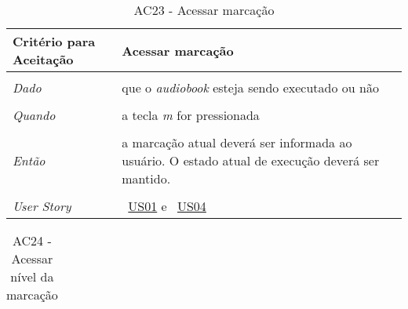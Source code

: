 \begin{apendicesenv}
\begin{table}[ht]
\begin{center}
\begin{tabularx}{\textwidth}{|lX|l|}
\end{tabularx}
\end{center}
\label{tab:us01a22}
\end{table}


\begin{table}[ht]
\centering
\caption{AC23 - Acessar marcação}
\vspace{0.1cm}
\begin{center}
\begin{tabularx}{\textwidth}{|lX|l|}

\hline
\textbf{Critério para Aceitação} & Acessar marcação \\
\hline
 & \\			
\textit{Dado} & que o \textit{audiobook} esteja sendo executado ou não \\
 & \\
\textit{Quando} & a tecla \textit{m} for pressionada \\
 & \\
\textit{Então} & a marcação atual deverá ser informada ao usuário. O estado atual de execução deverá ser mantido. \\
 & \\
\hline
\textit{User Story} & ~\hyperref[tab:us01]{US01} e ~\hyperref[tab:us01]{US04} \\
\hline

\end{tabularx}
\end{center}
\label{tab:us01a23}
\end{table}


\begin{table}[ht]
\centering
\caption{AC24 - Acessar nível da marcação}
\vspace{0.1cm}
\begin{center}
\begin{tabularx}{\textwidth}{|lX|l|}


\end{tabularx}
\end{center}
\end{table}
\end{apendicesenv}
